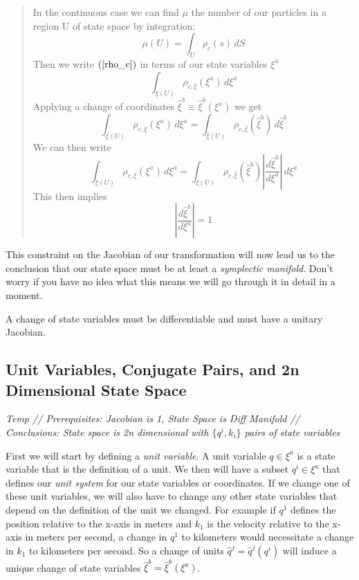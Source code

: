\documentclass{article}
\begin{document}
\begin{quote}
In the continuous case we can find $\mu$ the number of our particles in a region U of state space by integration:
	\begin{equation}
	\label{rho_c}
	\mu(U) = \int_{U} \rho_c(s)\, dS
	\end{equation}
Then we write $(\ref{rho_c})$ in terms of our state variables $\xi^a$ 
	\begin{equation}
	\label{rho_xia}
	\int_{\xi(U)} \rho_{c,\xi}(\xi^a) \, d\xi^a
	\end{equation}
Applying a change of coordinates $\hat{\xi}^b \equiv \hat{\xi}^b(\xi^a)$ we get
	\begin{equation}
	\label{rho_xib}
	\int_{\xi(U)} \rho_{c,\xi}(\xi^a) \, d\xi^a = \int_{\hat{\xi}(U)} \rho_{c,\hat{\xi}}(\hat{\xi}^b) \, d\hat{\xi}^b
	\end{equation}
We can then write
	\begin{equation}
	\label{rho_J}
	\int_{\xi(U)} \rho_{c,\xi}(\xi^a) \, d\xi^a = \int_{\xi(U)} \rho_{c,\hat{\xi}}(\hat{\xi}^b) \left|\frac{d\hat{\xi}^b}{d\xi^a}\right| \, d\xi^a
	\end{equation}
This then implies
	\begin{equation}
	\label{}
	\left|\frac{d\hat{\xi}^b}{d\xi^a}\right| = 1
	\end{equation}
\end{quote}
This constraint on the Jacobian of our transformation will now lead us to the conclusion that our state space must be at least a \textit{symplectic manifold}. Don't worry if you have no idea what this means we will go through it in detail in a moment.

\begin{prop}
	A change of state variables must be differentiable and must have a unitary Jacobian.
\end{prop}


\subsection{Unit Variables, Conjugate Pairs, and 2n Dimensional State Space}
\textsl{Temp // Prerequisites: Jacobian is 1, State Space is Diff Manifold // Conclusions: State space is 2n dimensional with $\{q^i,k_i\}$ pairs of state variables}

	First we will start by defining a \textit{unit variable}. A unit variable $q \in \xi^a$ is a state variable that is the definition of a unit. We then will have a subset $q^i \in \xi^a$ that defines our \textit{unit system} for our state variables or coordinates. If we change one of these unit variables, we will also have to change any other state variables that depend on the definition of the unit we changed. For example if $q^1$ defines the position relative to the x-axis in meters and $k_1$ is the velocity relative to the x-axis in meters per second, a change in $q^1$ to kilometers would necessitate a change in $k_1$ to kilometers per second. So a change of units $\hat{q}^j = \hat{q}^j(q^i)$ will induce a unique change of state variables $\hat{\xi}^b = \hat{\xi}^b(\xi^a)$.
	
\end{document}
